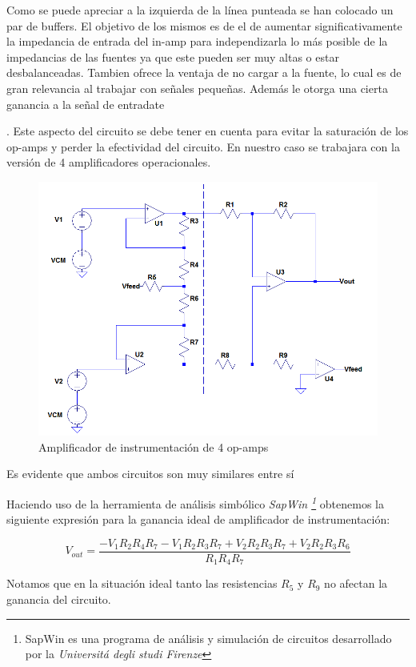 \documentclass[a4paper]{article}
\begin{document}
	Como se puede apreciar a la izquierda de la línea punteada se han colocado un par de buffers. El objetivo de los mismos es de el de aumentar significativamente la impedancia de entrada del in-amp para independizarla lo más posible de la impedancias de las fuentes ya que este pueden ser muy altas o estar desbalanceadas. Tambien ofrece la ventaja de no cargar a la fuente, lo cual es de gran relevancia al trabajar con señales pequeñas. Además le otorga una cierta ganancia a la señal de entradate{. Este aspecto del circuito se debe tener en cuenta para evitar la saturación de los op-amps y perder la efectividad del circuito.
	En nuestro caso se trabajara con la versión de 4 amplificadores operacionales.
	\begin{figure}[H]
		\centering
		\includegraphics[width=\linewidth]{../ImagenesVarias/inAmpSch.png}
		\caption{Amplificador de instrumentación de 4 op-amps}
	\end{figure}
	
	
	Es evidente que ambos circuitos son muy similares entre sí

	Haciendo uso de la herramienta de análisis simbólico \textit{SapWin \footnote{SapWin es una programa de análisis y simulación de circuitos desarrollado por la \textit{Universitá degli studi Firenze}}} obtenemos la siguiente expresión para la ganancia ideal de amplificador de instrumentación:
	
	$$V_{out}=\frac{-V_1 R_2 R_4 R_7 - 
					V_1 R_2 R_3 R_7 +
					V_2 R_2 R_3 R_7+
					V_2 R_2 R_3 R_6
					}{R_1 R_4 R_7}$$ 
	
	Notamos que en la situación ideal tanto las resistencias $R_5$ y $R_9$ no afectan la ganancia del circuito.
}
\end{document}
